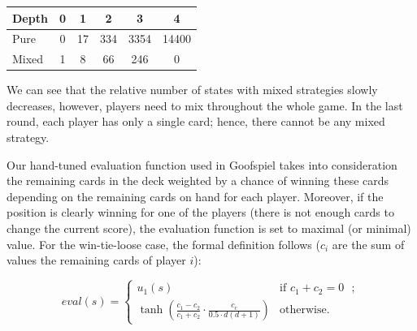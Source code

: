 \vspace{0.1cm}

\begin{center}
\small
\begin{tabular}{|l|c|c|c|c|c|}
\hline Depth & 0 & 1 & 2 & 3 & 4 \\
\hline Pure  & 0 & 17 & 334 & 3354 & 14400 \\
\hline Mixed & 1 &  8 &  66 &  246 & 0 \\
\hline
\end{tabular}
\end{center}

\vspace{0.1cm}

We can see that the relative number of states with mixed strategies slowly decreases, however, players need to mix throughout the whole game.
In the last round, each player has only a single card; hence, there cannot be any mixed strategy.


Our hand-tuned evaluation function used in Goofspiel takes into consideration the remaining cards in the deck weighted by a chance of winning these cards depending on the remaining cards on hand for each player. 
Moreover, if the position is clearly winning for one of the players (there is not enough cards to change the current score), the evaluation function is set to maximal (or minimal) value.
For the win-tie-loose case, the formal definition follows ($c_i$ are the sum of values the remaining cards of player $i$):

\[
eval(s) = \left\{ \begin{array}{ll}
  u_1(s) & \mbox{if $c_1 + c_2 = 0$ };\\
  \tanh\left(\frac{c_1 - c_2}{c_1 + c_2}\cdot\frac{c_c}{0.5 \cdot d(d+1)}\right) & \mbox{otherwise.} \end{array} \right.
\]


